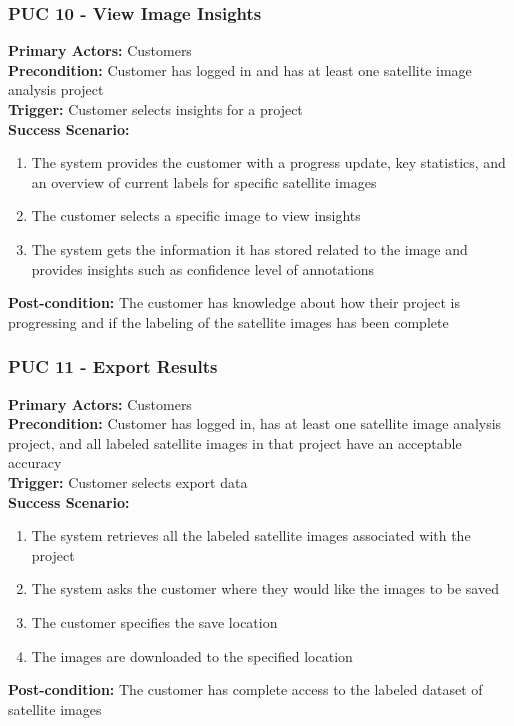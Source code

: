 \documentclass[12pt]{article}
\begin{document}
\subsubsection{PUC 10 - View Image Insights}
\textbf{Primary Actors:} Customers\\
\textbf{Precondition:} Customer has logged in and has at least one satellite image analysis project\\
\textbf{Trigger:} Customer selects insights for a project\\
\textbf{Success Scenario:}
\begin{enumerate}
    \item The system provides the customer with a progress update, key statistics, and an overview of current labels for specific satellite images
    \item The customer selects a specific image to view insights 
    \item The system gets the information it has stored related to the image and provides insights such as confidence level of annotations
\end{enumerate}
\textbf{Post-condition:} The customer has knowledge about how their project is progressing and if the labeling of the satellite images has been complete

\subsubsection{PUC 11 - Export Results}
\textbf{Primary Actors:} Customers\\
\textbf{Precondition:} Customer has logged in, has at least one satellite image analysis project, and all labeled satellite images in that project have an acceptable accuracy\\
\textbf{Trigger:} Customer selects export data\\
\textbf{Success Scenario:}
\begin{enumerate}
    \item The system retrieves all the labeled satellite images associated with the project
    \item The system asks the customer where they would like the images to be saved
    \item The customer specifies the save location
    \item The images are downloaded to the specified location
\end{enumerate}
\textbf{Post-condition:} The customer has complete access to the labeled dataset of satellite images
\end{document}
